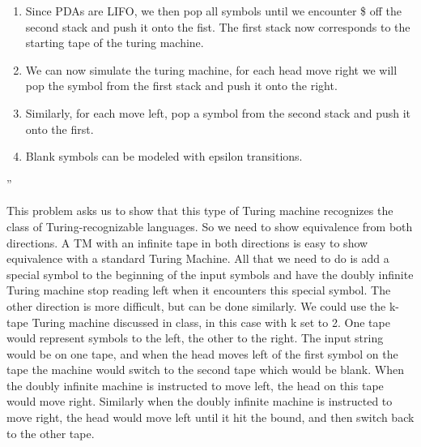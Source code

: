 \begin{problem}{5}
\begin{solution}
\begin{itemize}
\begin{enumerate}
          \item Since PDAs are LIFO, we then pop all symbols until we encounter \$ off the second stack and push it onto the fist.  The first stack now corresponds to the starting tape of the turing machine. \\
          \item We can now simulate the turing machine, for each head move right we will pop the symbol from the first stack and push it onto the right. \\
          \item Similarly, for each move left, pop a symbol from the second stack and push it onto the first. \\
          \item Blank symbols can be modeled with epsilon transitions.
        \end{enumerate}
      ''
    \end{itemize}
  \end{solution}
\end{problem}

\begin{problem}{6}
  \begin{solution}
    This problem asks us to show that this type of Turing machine recognizes the class of Turing-recognizable languages.
    So we need to show equivalence from both directions.
    \br
    A TM with an infinite tape in both directions is easy to show equivalence with a standard Turing Machine.  All that
    we need to do is add a special symbol to the beginning of the input symbols and have the doubly infinite Turing
    machine stop reading left when it encounters this special symbol.
    \br
    The other direction is more difficult, but can be done similarly.  We could use the k-tape Turing machine discussed
    in class, in this case with k set to 2.  One tape would represent symbols to the left, the other to the right. The
    input string would be on one tape, and when the head moves left of the first symbol on the tape the machine would
    switch to the second tape which would be blank. When the doubly infinite machine is instructed to move left, the
    head on this tape would move right.  Similarly when the doubly infinite machine is instructed to move right, the
    head would move left until it hit the bound, and then switch back to the other tape.
  \end{solution}
\end{problem}

